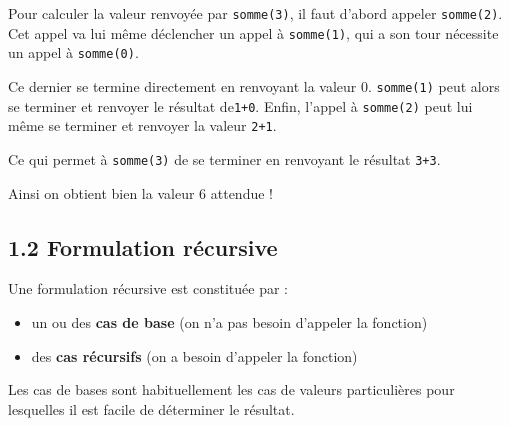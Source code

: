 \documentclass[a4paper,17pt]{extarticle}
\providecommand{\tightlist}{%
      \setlength{\itemsep}{0pt}\setlength{\parskip}{0pt}}
\begin{document}
\begin{exemple}
Pour calculer la valeur renvoyée par \texttt{somme(3)}, il faut d'abord
appeler \texttt{somme(2)}. Cet appel va lui même déclencher un appel à
\texttt{somme(1)}, qui a son tour nécessite un appel à
\texttt{somme(0)}.

Ce dernier se termine directement en renvoyant la valeur 0.
\texttt{somme(1)} peut alors se terminer et renvoyer le résultat
de\texttt{1+0}. Enfin, l'appel à \texttt{somme(2)} peut lui même se
terminer et renvoyer la valeur \texttt{2+1}.

Ce qui permet à \texttt{somme(3)} de se terminer en renvoyant le
résultat \texttt{3+3}.

Ainsi on obtient bien la valeur 6 attendue !

            \end{exemple}
    \hypertarget{formulation-ruxe9cursive}{%
\subsection{1.2 Formulation récursive}\label{formulation-ruxe9cursive}}

Une formulation récursive est constituée par :

\begin{itemize}
\tightlist
\item
  un ou des \textbf{cas de base} (on n'a pas besoin d'appeler la
  fonction)
\item
  des \textbf{cas récursifs} (on a besoin d'appeler la fonction)
\end{itemize}

Les cas de bases sont habituellement les cas de valeurs particulières
pour lesquelles il est facile de déterminer le résultat.
\end{document}

